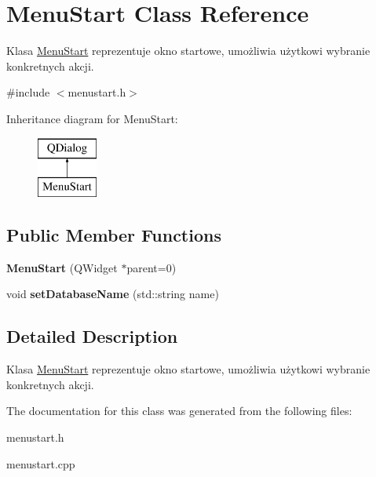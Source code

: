 \hypertarget{class_menu_start}{}\section{Menu\+Start Class Reference}
\label{class_menu_start}


Klasa \mbox{\hyperlink{class_menu_start}{Menu\+Start}} reprezentuje okno startowe, umożliwia użytkowi wybranie konkretnych akcji.  




{\ttfamily \#include $<$menustart.\+h$>$}

Inheritance diagram for Menu\+Start\+:\begin{figure}[H]
\begin{center}
\leavevmode
\includegraphics[height=2.000000cm]{class_menu_start}
\end{center}
\end{figure}
\subsection*{Public Member Functions}
\begin{DoxyCompactItemize}
\item 
\mbox{\label{class_menu_start_a184ff65bb2534378670fee22487b02eb}} 
{\bfseries Menu\+Start} (Q\+Widget $\ast$parent=0)
\item 
\mbox{\label{class_menu_start_a52634af21c3f1c8fc71c202d9618dab3}} 
void {\bfseries set\+Database\+Name} (std\+::string name)
\end{DoxyCompactItemize}


\subsection{Detailed Description}
Klasa \mbox{\hyperlink{class_menu_start}{Menu\+Start}} reprezentuje okno startowe, umożliwia użytkowi wybranie konkretnych akcji. 

The documentation for this class was generated from the following files\+:\begin{DoxyCompactItemize}
\item 
menustart.\+h\item 
menustart.\+cpp\end{DoxyCompactItemize}
